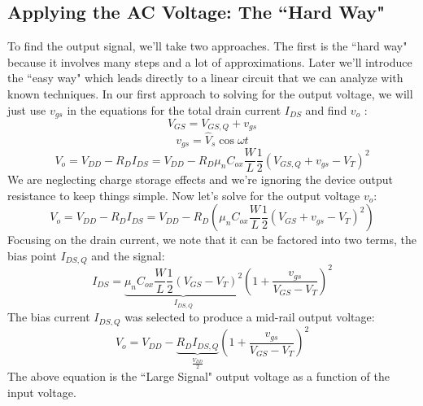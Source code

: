\subsection{Applying the AC Voltage:  The ``Hard Way"}
To find the output signal, we'll take two approaches.  The first is the ``hard way" because it involves many steps and a lot of approximations.  Later we'll introduce the ``easy way" which leads directly to a linear circuit that we can analyze with known techniques.  
In our first approach to solving for the output voltage, we will just use $v_{gs}$ in the equations for the total drain current $I_{DS}$  and find $v_o$ :
    \begin{equation}
        {V_{GS}} = {V_{GS,Q}} + {v_{gs}}
    \end{equation}
    \begin{equation}
        v_{gs} = {\hat V_s}\cos \omega t
    \end{equation}
    \begin{equation}
        {V_o} = {V_{DD}} - {R_D}{I_{DS}} = {V_{DD}} - {R_D}{\mu _n}{C_{ox}}\frac{W}{L}\frac{1}{2}{({V_{GS,Q}} + {v_{gs}} - {V_T})^2}
    \end{equation}
We are neglecting charge storage effects and we're ignoring the device output resistance to keep things simple.  Now let's solve for the output voltage $v_o$:
    \begin{equation}
        {V_o} = {V_{DD}} - {R_D}{I_{DS}} = {V_{DD}} - {R_D}\left( {\mu _n}{C_{ox}}\frac{W}{L}\frac{1}{2}{({V_{GS}} + {v_{gs}} - {V_T})^2} \right)
    \end{equation}
Focusing on the drain current, we note that it can be factored into two terms, the bias point $I_{DS,Q}$ and the signal:
    \begin{equation}
        I_{DS} = \underbrace{{\mu _n}{C_{ox}}\frac{W}{L}\frac{1}{2}{({V_{GS}} - {V_T})^2}}_{I_{DS,Q}}{\left( {1 + \frac{{{v_{gs}}}}{{{V_{GS}} - {V_T}}}} \right)^2}
    \end{equation}
The bias current $I_{DS,Q}$ was selected to produce a mid-rail output voltage:
    \begin{equation}
        {V_o} = {V_{DD}} - \underbrace{ {R_D}{I_{DS,Q}}}_{\frac{V_{DD}}{2}}{\left( {1 + \frac{{{v_{gs}}}}{{{V_{GS}} - {V_T}}}} \right)^2}
    \end{equation}
The above equation is the ``Large Signal" output voltage as a function of the input voltage.
